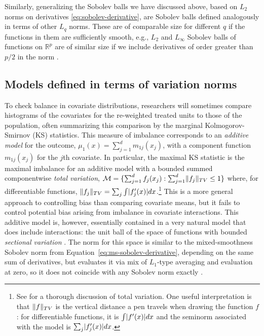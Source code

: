 \documentclass{article}
\DeclarePairedDelimiter\norm{\lVert}{\rVert}
\DeclarePairedDelimiter\abs{\lvert}{\rvert}
\DeclarePairedDelimiter\set{\{}{\}}
\theoremstyle{definition}
\newcommand{\R}{\ensuremath{\mathbb{R}}}
\newcommand{\model}{\mathcal{M}}
\newcommand{\<}{\langle}
\renewcommand{\>}{\rangle}
\begin{document}
\begin{refsection}
Similarly, generalizing the Sobolev balls we have discussed above, based on $L_2$ norms on derivatives \eqref{eq:sobolev-derivative}, are Sobolev balls defined analogously in terms of other $L_q$ norms. These are of comparable size for different $q$ if the functions in them are sufficiently smooth, e.g., $L_2$ and $L_\infty$ Sobolev balls of functions on $\R^p$ are of similar size if we include derivatives of order greater than $p/2$ in the norm \citep[e.g.,][Corollary 4]{nickl2007bracketing}. %

\subsection{Models defined in terms of variation norms}
\label{sec:variation-models}
To check balance in covariate distributions, researchers will sometimes compare histograms of the covariates for the re-weighted treated units to those of the population, often summarizing this comparison by the marginal Kolmogorov-Smirnov (KS) statistics.
This measure of imbalance corresponds to an \emph{additive model} for the outcome, $\mu_1(x)=\sum_{j=1}^d m_{1j}(x_j)$, with a component function $m_{1j}(x_j)$ for the $j$th covariate. In particular, the maximal KS statistic is the maximal imbalance for
an additive model with a bounded summed componentwise \emph{total variation},
$\model = \set{ \sum_{j=1}^d f_j(x_j) : \sum_{j=1}^d \norm{f_j}_{TV} \le 1}$ where, for differentiable functions, $\norm{f_j}_{TV} = \sum_j \int \abs{f_j'(x)}dx$.\footnote{See \cite{fang2021multivariate} for a thorough discussion of total variation.
One useful interpretation is that $\norm{f}_{TV}$ is the vertical distance a pen travels when drawing the function $f$: for differentiable functions, it is $\int \abs{f'(x)}dx$
and the seminorm associated with the model is $\sum_j \abs{f_j'(x)}dx$.}
This is a more general approach to controlling bias than comparing covariate means, but it fails to control potential bias arising from imbalance in covariate interactions. This additive model is, however, essentially contained in a very natural model that does include interactions: the unit ball of the space of functions with bounded \emph{sectional variation} \citep{bibaut2019fast, fang2021multivariate}. The norm for this space is similar to the mixed-smoothness Sobolev norm from Equation~\ref{eq:ms-sobolev-derivative}, depending on the same sum of derivatives, but evaluates it via mix of $L_1$-type averaging and evaluation at zero, so it does not coincide with any Sobolev norm exactly \citep[see Equations 23 and 25 in][]{fang2021multivariate}.


\end{refsection}
\end{document}
